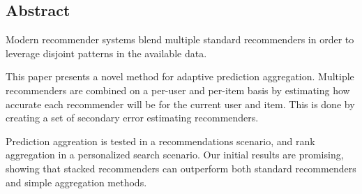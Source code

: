 \begin{narrow}

\chapter*{Abstract}

Modern recommender systems blend multiple standard recommenders
in order to leverage disjoint patterns in the available data.

This paper presents a novel method for adaptive prediction aggregation.
Multiple recommenders are combined on a per-user and per-item basis
by estimating how accurate each recommender will be for the current user and item.
This is done by creating a set of secondary error estimating recommenders.

Prediction aggreation is tested in a recommendations scenario,
and rank aggregation in a personalized search scenario.
Our initial results are promising, showing that stacked recommenders
can outperform both standard recommenders and simple aggregation methods.

\end{narrow}

\vfill
